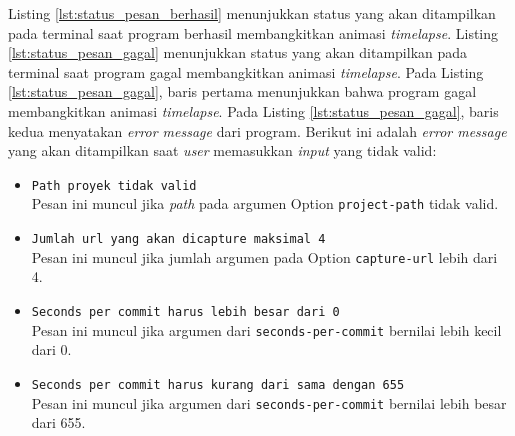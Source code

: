 Listing \ref{lst:status_pesan_berhasil} menunjukkan status yang akan ditampilkan pada terminal saat program berhasil membangkitkan animasi \textit{timelapse}. Listing \ref{lst:status_pesan_gagal} menunjukkan status yang akan ditampilkan pada terminal saat program gagal membangkitkan animasi \textit{timelapse}. Pada Listing \ref{lst:status_pesan_gagal}, baris pertama menunjukkan bahwa program gagal membangkitkan animasi \textit{timelapse}. Pada Listing \ref{lst:status_pesan_gagal}, baris kedua menyatakan \textit{error message} dari program. Berikut ini adalah \textit{error message} yang akan ditampilkan saat \textit{user} memasukkan \textit{input} yang tidak valid:
\begin{itemize}
\item \texttt{Path proyek tidak valid}\\
Pesan ini muncul jika \textit{path} pada argumen Option \texttt{project-path} tidak valid.
\item \texttt{Jumlah url yang akan dicapture maksimal 4}\\
Pesan ini muncul jika jumlah argumen pada Option \texttt{capture-url} lebih dari 4.
\item \texttt{Seconds per commit harus lebih besar dari 0}\\
Pesan ini muncul jika argumen dari \texttt{seconds-per-commit} bernilai lebih kecil dari 0.

\item \texttt{Seconds per commit harus kurang dari sama dengan 655}\\
Pesan ini muncul jika argumen dari \texttt{seconds-per-commit} bernilai lebih besar dari 655.


\end{itemize}
